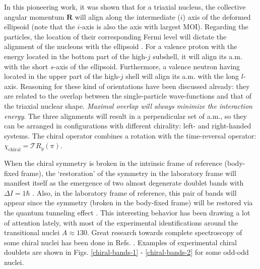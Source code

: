 In this pioneering work, it was shown that for a triaxial nucleus, the collective angular momentum $\mathbf{R}$ will align along the intermediate ($i$) axis of the deformed ellipsoid (note that the $i$-axis is also the axis with largest MOI). Regarding the particles, the location of their corresponding Fermi level will dictate the alignment of the nucleons with the ellipsoid \cite{frauendorf1997tilted,starosta2001chiral}. For a valence proton with the energy located in the bottom part of the high-$j$ subshell, it will align its a.m. with the short $s$-axis of the ellipsoid. Furthermore, a valence neutron having located in the upper part of the high-$j$ shell will align its a.m. with the long $l$-axis. Reasoning for these kind of orientations have been discussed already: they are related to the overlap between the single-particle wave-functions and that of the triaxial nuclear shape. \emph{Maximal overlap will always minimize the interaction energy}. The three alignments will result in a perpendicular set of a.m., so they can be arranged in configurations with different chirality: left- and right-handed systems. The chiral operator combines a rotation with the time-reversal operator: $\chi_\text{chiral}=\mathcal{T}R_y(\pi)$.

When the chiral symmetry is broken in the intrinsic frame of reference (body-fixed frame), the `restoration' of the symmetry in the laboratory frame will manifest itself as the emergence of two almost degenerate doublet bands with $\Delta I=1\hbar$ \cite{frauendorf1997tilted}. Also, in the laboratory frame of reference, this pair of bands will appear since the symmetry (broken in the body-fixed frame) will be restored via the quantum tunneling effect \cite{zhang2007chiral}. This interesting behavior has been drawing a lot of attention lately, with most of the experimental identifications around the transitional nuclei $A\approx 130$. Great research towards complete spectroscopy of some chiral nuclei has been done in Refs. \cite{starosta2001chiral,meng2008chiral,budaca2018tilted,budaca2018semiclassical,budaca2021chiral}. Examples of experimental chiral doublets are shown in Figs. \ref{chiral-bands-1} - \ref{chiral-bands-2} for some odd-odd nuclei.

